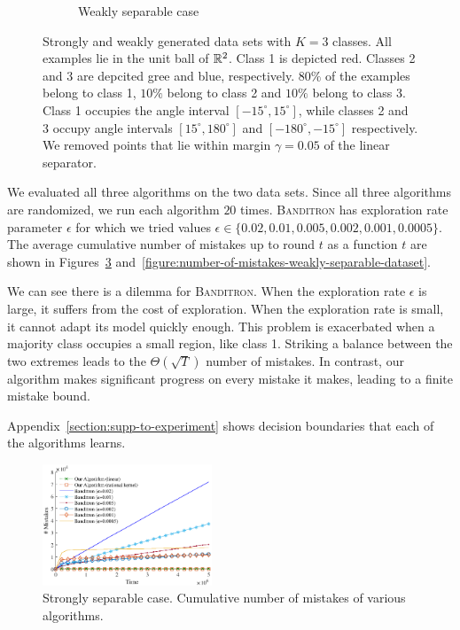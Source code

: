\begin{figure}[h]
\begin{subfigure}[b]{0.23\textwidth}
\caption{Weakly separable case}
\label{figure:weakly-separable-dataset}
\end{subfigure}
\vspace*{-0.2cm}
\caption{Strongly and weakly generated data sets with $K=3$ classes. All
examples lie in the unit ball of $\mathbb{R}^2$. Class 1 is depicted red. Classes 2 and
3 are depcited gree and blue, respectively. $80\%$ of the examples belong to class 1,
$10\%$ belong to class 2 and $10\%$ belong to class 3. Class 1
occupies the angle interval $[-15^\circ, 15^\circ]$, while classes 2 and 3
occupy angle intervals $[15^\circ, 180^\circ]$ and $[-180^\circ, -15^\circ]$
respectively. We removed points that lie within margin $\gamma=0.05$ of the
linear separator.}
\label{figure:strongly-and-weakly-separable-datasets}
\end{figure}

We evaluated all three algorithms on the two data sets. Since all three
algorithms are randomized, we run each algorithm $20$ times. \textsc{Banditron}
has exploration rate parameter $\epsilon$ for which we tried values $\epsilon
\in \{0.02, 0.01, 0.005, 0.002, 0.001, 0.0005 \}$. The average cumulative number
of mistakes up to round $t$ as a function $t$ are shown in
Figures~\ref{figure:number-of-mistakes-strongly-separable-dataset}
and~\ref{figure:number-of-mistakes-weakly-separable-dataset}.

We can see there is a dilemma for \textsc{Banditron}. When the
exploration rate $\epsilon$ is large, it suffers from the cost of exploration.
When the exploration rate is small, it cannot adapt its model quickly enough.
This problem is exacerbated when a majority class occupies a small region, like
class 1. Striking a balance between the two extremes leads to the
$\Theta(\sqrt{T})$ number of mistakes. In contrast, our algorithm makes
significant progress on every mistake it makes, leading to a finite mistake
bound.

Appendix~\ref{section:supp-to-experiment} shows decision boundaries
that each of the algorithms learns.

\begin{figure}
\centering
\includegraphics[width=0.45\textwidth]{figures/strong3}
\caption{Strongly separable case. Cumulative number of mistakes of various algorithms.}
\label{figure:number-of-mistakes-strongly-separable-dataset}
\end{figure}

